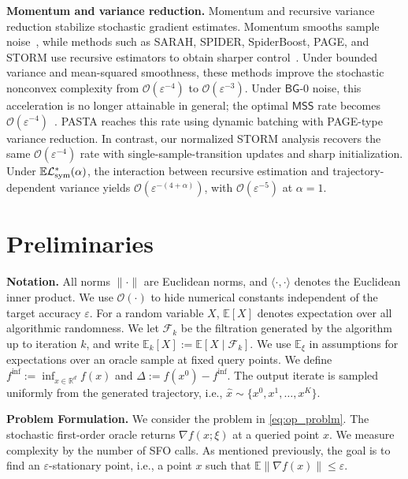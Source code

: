 \documentclass[letter,11pt]{article}
\newcommand{\E}{\mathbb{E}}
\newcommand{\R}{\mathbb{R}}
\newcommand{\cF}{\mathcal{F}}
\newcommand{\Ocal}{\mathcal{O}}
\newcommand{\Lcal}{\mathcal{L}}
\begin{document}
\textbf{Momentum and variance reduction.} Momentum and recursive variance reduction stabilize stochastic gradient estimates. Momentum smooths sample noise~\cite{cutkosky2020momentum}, while methods such as SARAH, SPIDER, SpiderBoost, PAGE, and STORM use recursive estimators to obtain sharper control~\cite{nguyen2017sarah,fang2018spider,wang2018spiderboost,li2021page,cutkosky2019momentum}. Under bounded variance and mean-squared smoothness, these methods improve the stochastic nonconvex complexity from $\Ocal(\varepsilon^{-4})$ to $\Ocal(\varepsilon^{-3})$. Under $\mathsf{BG}$-0 noise, this acceleration is no longer attainable in general; the optimal $\mathsf{MSS}$ rate becomes $\Ocal(\varepsilon^{-4})$~\cite{fazla2026lower}. PASTA reaches this rate using dynamic batching with PAGE-type variance reduction. In contrast, our normalized STORM analysis recovers the same $\Ocal(\varepsilon^{-4})$ rate with single-sample-transition updates and sharp initialization. Under $\E\Lcal^*_{\rm sym}(\alpha)$, the interaction between recursive estimation and trajectory-dependent variance yields $\Ocal(\varepsilon^{-(4+\alpha)})$, with $\Ocal(\varepsilon^{-5})$ at $\alpha=1$.


\section{Preliminaries}
\label{sec:prelim}
\textbf{Notation.}
All norms $\|\cdot\|$ are Euclidean norms, and $\langle \cdot,\cdot\rangle$ denotes the Euclidean inner product. We use $\Ocal(\cdot)$ to hide numerical constants
independent of the target accuracy $\varepsilon$. For a random variable $X$, $\E[X]$ denotes expectation over all algorithmic randomness. We let $\cF_k$ be the filtration generated by the algorithm up to iteration $k$, and write $\E_k[X]:=\E[X\mid\cF_k]$. We use \(\E_\xi\) in assumptions for expectations over an oracle sample at fixed query points. We define $f^{\inf}:=\inf_{x\in\R^d} f(x)$ and $\Delta:=f(x^0)-f^{\inf}$. The output iterate is sampled uniformly from the generated trajectory, i.e., $\widehat{x}\sim \{x^0, x^1, \dots, x^K\}.$

\textbf{Problem Formulation.} We consider the problem in \eqref{eq:op_problm}. The stochastic first-order oracle returns $\nabla f(x;\xi)$ at a queried point $x$. We measure complexity by the number of SFO calls. As mentioned previously, the goal is to find an $\varepsilon$-stationary point, i.e., a point $x$ such that $\E\|\nabla f(x)\|\le \varepsilon.$
\end{document}
